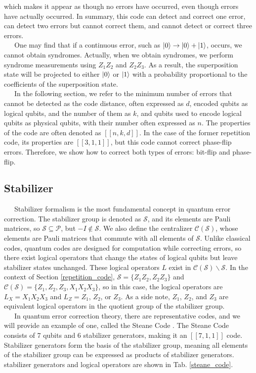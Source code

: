 \documentclass[a4paper,11pt]{ltjsarticle}
\begin{document}
{{{            which makes it appear as though no errors have occurred, even though errors have actually occurred. In summary, this code can detect and correct one error, can detect two errors but cannot correct them, and cannot detect or correct three errors.\\
            \ \ \ One may find that if a continuous error, such as $\ket{0} \rightarrow \ket{0} + \ket{1}$, occurs, we cannot obtain syndromes. Actually, when we obtain syndromes, we perform syndrome measurements using $Z_1 Z_2$ and $Z_2 Z_3$. As a result, the superposition state will be projected to either $\ket{0}$ or $\ket{1}$ with a probability proportional to the coefficients of the superposition state.\\
            \ \ \ In the following section, we refer to the minimum number of errors that cannot be detected as the code distance, often expressed as $d$, encoded qubits as logical qubits, and the number of them as $k$, and qubits used to encode logical qubits as physical qubits, with their number often expressed as $n$. The properties of the code are often denoted as $[[n, k, d]]$. In the case of the former repetition code, its properties are $[[3, 1, 1]]$, but this code cannot correct phase-flip errors. Therefore, we show how to correct both types of errors: bit-flip and phase-flip.
        }

        \subsection{Stabilizer}{
            \ \ \ Stabilizer formalism is the most fundamental concept in quantum error correction. The stabilizer group is denoted as $\mathcal{S}$, and its elements are Pauli matrices, so $\mathcal{S} \subseteq \mathcal{P}$, but $-I \not\in \mathcal{S}$. We also define the centralizer $\mathcal{C(S)}$, whose elements are Pauli matrices that commute with all elements of $\mathcal{S}$. Unlike classical codes, quantum codes are designed for computation while correcting errors, so there exist logical operators that change the states of logical qubits but leave stabilizer states unchanged. These logical operators $L$ exist in $\mathcal{C(S)} \backslash \mathcal{S}$. In the context of Section \ref{repetition_code}, $\mathcal{S} = \{Z_1Z_2, Z_2Z_3\}$ and $\mathcal{C(S)} = \{Z_1, Z_2, Z_3, X_1X_2X_3\}$, so in this case, the logical operators are $L_X = X_1X_2X_3$ and $L_Z = Z_1$, $Z_2$, or $Z_3$. As a side note, $Z_1$, $Z_2$, and $Z_3$ are equivalent logical operators in the quotient group of the stabilizer group.\\
            \ \ \ In quantum error correction theory, there are representative codes, and we will provide an example of one, called the Steane Code \cite{steane1996}. The Steane Code consists of 7 qubits and 6 stabilizer generators, making it an $[[7, 1, 1]]$ code. Stabilizer generators form the basis of the stabilizer group, meaning all elements of the stabilizer group can be expressed as products of stabilizer generators. stabilizer generators and logical operators are shown in Tab. \ref{steane_code}.

}}}
\end{document}
